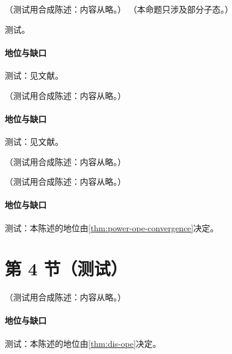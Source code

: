 \begin{proposition}\label{prop:front-coordinate-space}
（测试用合成陈述：内容从略。）
（本命题只涉及部分子态。）
\end{proposition}
\begin{proofsketch}测试。\end{proofsketch}
\paragraph{地位与缺口}测试：见文献。

\begin{proposition}\label{prop:front-local-ir}
（测试用合成陈述：内容从略。）
\end{proposition}
\paragraph{地位与缺口}测试：见文献。

\begin{remark}\label{rem:front-landau-algebraic}
（测试用合成陈述：内容从略。）
\end{remark}

\begin{proposition}\label{prop:front-ope-scalar}
（测试用合成陈述：内容从略。）
\end{proposition}
\paragraph{地位与缺口}测试：本陈述的地位由\cref{thm:power-ope-convergence}决定。

\section{第 4 节（测试）}\label{sec:front-regions}

\begin{proposition}\label{prop:front-ope-ym}
（测试用合成陈述：内容从略。）
\end{proposition}
\paragraph{地位与缺口}测试：本陈述的地位由\cref{thm:dis-ope}决定。

